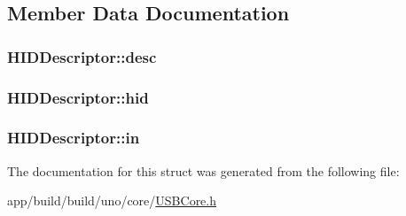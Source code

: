 \subsection{Member Data Documentation}
\hypertarget{struct_h_i_d_descriptor_a3e8631944ed908ad2f8b36685b689a87}{
\subsubsection[{desc}]{ H\-I\-D\-Descriptor\-::desc}}\label{struct_h_i_d_descriptor_a3e8631944ed908ad2f8b36685b689a87}
\hypertarget{struct_h_i_d_descriptor_ae72a473536f32b7e6cab5537ea9941e0}{
\subsubsection[{hid}]{ H\-I\-D\-Descriptor\-::hid}}\label{struct_h_i_d_descriptor_ae72a473536f32b7e6cab5537ea9941e0}
\hypertarget{struct_h_i_d_descriptor_acc38a209fa31af987724b82b48a669ff}{
\subsubsection[{in}]{ H\-I\-D\-Descriptor\-::in}}\label{struct_h_i_d_descriptor_acc38a209fa31af987724b82b48a669ff}


The documentation for this struct was generated from the following file\-:\begin{DoxyCompactItemize}
\item 
app/build/build/uno/core/\hyperlink{_u_s_b_core_8h}{U\-S\-B\-Core.\-h}\end{DoxyCompactItemize}
